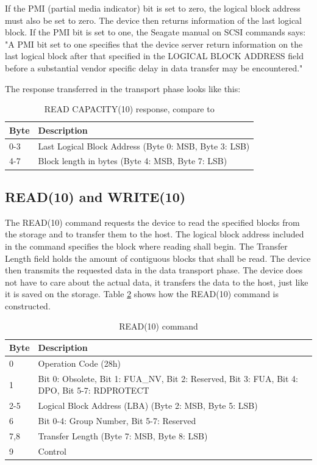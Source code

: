 If the PMI (partial media indicator) bit is set to zero, the logical block address must also be set to zero. The device then returns information of the last logical block. If the PMI bit is set to one, the Seagate manual on SCSI commands says: "A PMI bit set to one specifies that the device server return information on the last logical block after that specified in the LOGICAL BLOCK ADDRESS field before a substantial vendor specific delay in data transfer may be encountered."\cite{scsi_seagate}

The response transferred in the transport phase looks like this:

\begin{table}[ht]
\caption{READ CAPACITY(10) response, compare to \cite{usb_ms_jan, scsi_seagate}}
\centering
\begin{tabular}{|l|l|}
\hline\hline
\textbf{Byte} & \textbf{Description}\\ \hline
0-3 & Last Logical Block Address (Byte 0: MSB, Byte 3: LSB)\\ \hline
4-7 & Block length in bytes (Byte 4: MSB, Byte 7: LSB) \\ \hline
\end{tabular}
\label{table:read_capacity_response}
\end{table}

\subsection{READ(10) and WRITE(10)}

The READ(10) command requests the device to read the specified blocks from the storage and to transfer them to the host. The logical block address included in the command specifies the block where reading shall begin. The Transfer Length field holds the amount of contiguous blocks that shall be read. The device then transmits the requested data in the data transport phase. The device does not have to care about the actual data, it transfers the data to the host, just like it is saved on the storage. Table \ref{table:read_10} shows how the READ(10) command is constructed.

\begin{table}[ht]
\caption{READ(10) command \cite{scsi_seagate}}
\centering
\begin{tabular}{|l|p{10cm}|}
\hline\hline
\textbf{Byte} & \textbf{Description}\\ \hline
0 & Operation Code (28h)\\ \hline
1 & Bit 0: Obsolete, Bit 1: FUA\_NV, Bit 2: Reserved, Bit 3: FUA, Bit 4: DPO, Bit 5-7: RDPROTECT \\ \hline
2-5 & Logical Block Address (LBA) (Byte 2: MSB, Byte 5: LSB) \\ \hline
6 & Bit 0-4: Group Number, Bit 5-7: Reserved \\ \hline
7,8 & Transfer Length (Byte 7: MSB, Byte 8: LSB) \\ \hline
9 & Control \\ \hline
\end{tabular}
\label{table:read_10}
\end{table}

